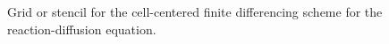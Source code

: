 \begin{figure}[tb!]
\begin{center}
\begin{tikzpicture}[scale=0.75]
\end{tikzpicture}
\caption{Grid or stencil for the cell-centered finite differencing scheme for the reaction-diffusion equation.}
\label{Fig:ode_reactionDiffusionFiniteDifferenceStencil}
\end{center}
\end{figure}

%

